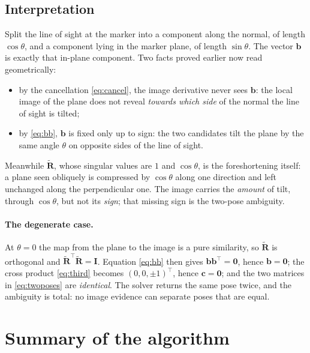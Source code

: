 \documentclass[11pt,a4paper]{article}
\theoremstyle{remark}
\newcommand{\Rtil}{\widetilde{\mathbf{R}}}
\newcommand{\Idm}{\mathbf{I}}
\newcommand{\bvec}{\mathbf{b}}
\newcommand{\cvec}{\mathbf{c}}
\newcommand{\zerovec}{\mathbf{0}}
\begin{document}
\subsection{Interpretation}

Split the line of sight at the marker into a component along the normal, of
length $\cos\theta$, and a component lying in the marker plane, of length
$\sin\theta$. The vector $\bvec$ is exactly that in-plane component. Two facts
proved earlier now read geometrically:
\begin{itemize}[leftmargin=*]
  \item by the cancellation \eqref{eq:cancel}, the image derivative never sees
        $\bvec$: the local image of the plane does not reveal \emph{towards
        which side} of the normal the line of sight is tilted;
  \item by \eqref{eq:bb}, $\bvec$ is fixed only up to sign: the two candidates
        tilt the plane by the same angle $\theta$ on opposite sides of the line
        of sight.
\end{itemize}
Meanwhile $\Rtil$, whose singular values are $1$ and $\cos\theta$, is the
foreshortening itself: a plane seen obliquely is compressed by $\cos\theta$
along one direction and left unchanged along the perpendicular one. The image
carries the \emph{amount} of tilt, through $\cos\theta$, but not its
\emph{sign}; that missing sign is the two-pose ambiguity.

\paragraph{The degenerate case.} At $\theta = 0$ the map from the plane to the
image is a pure similarity, so $\Rtil$ is orthogonal and
$\Rtil^{\top}\Rtil = \Idm$. Equation \eqref{eq:bb} then gives
$\bvec\bvec^{\top} = \mathbf{0}$, hence $\bvec = \zerovec$; the cross product
\eqref{eq:third} becomes $(0,0,\pm1)^{\top}$, hence $\cvec = \zerovec$; and the
two matrices in \eqref{eq:twoposes} are \emph{identical}. The solver returns the
same pose twice, and the ambiguity is total: no image evidence can separate
poses that are equal.

\section{Summary of the algorithm}
\end{document}

